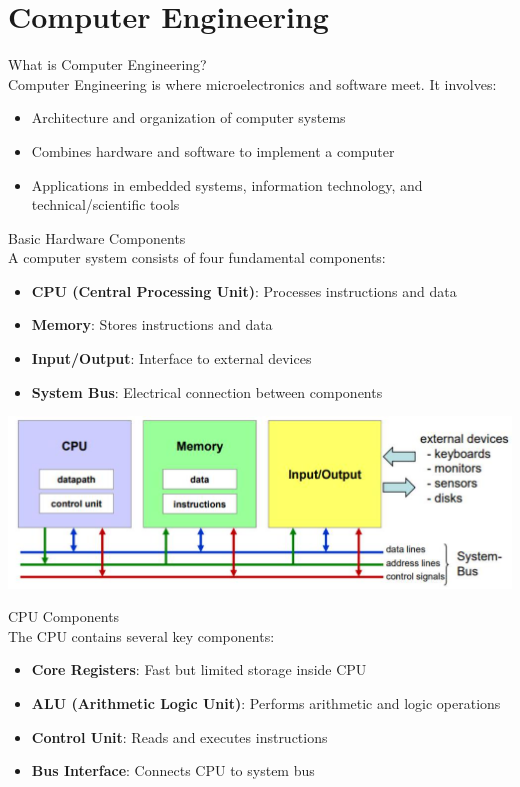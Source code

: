 \section{Computer Engineering}

\begin{concept}{What is Computer Engineering?}\\
Computer Engineering is where microelectronics and software meet. It involves:
\begin{itemize}
  \item Architecture and organization of computer systems
  \item Combines hardware and software to implement a computer
  \item Applications in embedded systems, information technology, and technical/scientific tools
\end{itemize}
\end{concept}

\begin{definition}{Basic Hardware Components}\\
A computer system consists of four fundamental components:
\begin{itemize}
  \item \textbf{CPU (Central Processing Unit)}: Processes instructions and data
  \item \textbf{Memory}: Stores instructions and data
  \item \textbf{Input/Output}: Interface to external devices
  \item \textbf{System Bus}: Electrical connection between components
\end{itemize}

\includegraphics[width=\linewidth]{images/2024_12_29_79e6b22f503fb7b4f718g-01(1)}
\end{definition}

\begin{definition}{CPU Components}\\
The CPU contains several key components:
\begin{itemize}
  \item \textbf{Core Registers}: Fast but limited storage inside CPU
  \item \textbf{ALU (Arithmetic Logic Unit)}: Performs arithmetic and logic operations
  \item \textbf{Control Unit}: Reads and executes instructions
  \item \textbf{Bus Interface}: Connects CPU to system bus
\end{itemize}
\end{definition}

